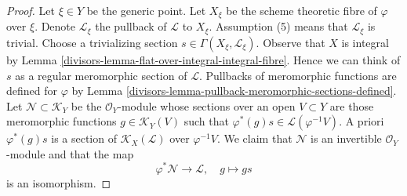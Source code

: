 \begin{proof}

Let $\xi \in Y$ be the generic point. Let $X_\xi$ be the scheme theoretic
fibre of $\varphi$ over $\xi$. Denote $\mathcal{L}_\xi$ the pullback of
$\mathcal{L}$ to $X_\xi$. Assumption (5) means that $\mathcal{L}_\xi$
is trivial. Choose a trivializing section
$s \in \Gamma(X_\xi, \mathcal{L}_\xi)$. Observe that $X$ is integral by
Lemma \ref{divisors-lemma-flat-over-integral-integral-fibre}.
Hence we can think of $s$ as a regular meromorphic section of $\mathcal{L}$.
Pullbacks of meromorphic functions are defined for
$\varphi$ by Lemma \ref{divisors-lemma-pullback-meromorphic-sections-defined}.
Let $\mathcal{N} \subset \mathcal{K}_Y$ be the $\mathcal{O}_Y$-module
whose sections over an open $V \subset Y$ are those meromorphic functions
$g \in \mathcal{K}_Y(V)$ such that
$\varphi^*(g)s \in \mathcal{L}(\varphi^{-1}V)$.
A priori $\varphi^*(g)s$ is a section of $\mathcal{K}_X(\mathcal{L})$ over
$\varphi^{-1}V$. We claim that $\mathcal{N}$ is an invertible
$\mathcal{O}_Y$-module and that the map
$$
\varphi^*\mathcal{N} \longrightarrow \mathcal{L},\quad
g \longmapsto gs
$$
is an isomorphism.


\end{proof}
